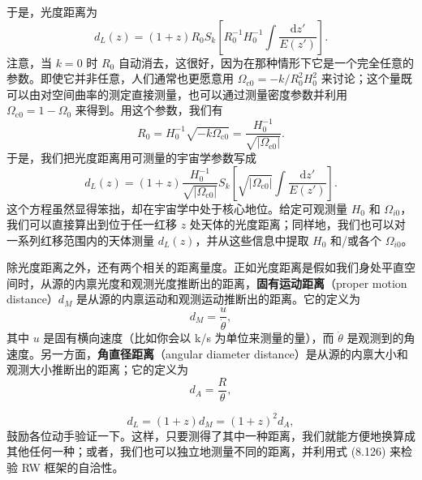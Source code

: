 于是，光度距离为
\begin{equation*}
d_L(z) = (1+z)R_0S_k\left[R_0^{-1}H_0^{-1}\int\frac{\mathrm{d}z'}{E(z')}\right].
\tag{8.121}
\end{equation*}
注意，当 $k=0$ 时 $R_0$ 自动消去，这很好，因为在那种情形下它是一个完全任意的参数。即使它并非任意，人们通常也更愿意用 $\Omega_{\mathrm{c}0}=-k/R_0^{2}H_0^{2}$ 来讨论；这个量既可以由对空间曲率的测定直接测量，也可以通过测量密度参数并利用 $\Omega_{\mathrm{c}0}=1-\Omega_0$ 来得到。用这个参数，我们有
\begin{equation*}
R_0 = H_0^{-1}\sqrt{-k\Omega_{\mathrm{c}0}} = \frac{H_0^{-1}}{\sqrt{|\Omega_{\mathrm{c}0}|}}.
\tag{8.122}
\end{equation*}
于是，我们把光度距离用可测量的宇宙学参数写成
\begin{equation*}
\boxed{\,d_L(z) = (1+z)\frac{H_0^{-1}}{\sqrt{|\Omega_{\mathrm{c}0}|}}S_k\left[\sqrt{|\Omega_{\mathrm{c}0}|}\int\frac{\mathrm{d}z'}{E(z')}\right].\,}
\tag{8.123}
\end{equation*}
这个方程虽然显得笨拙，却在宇宙学中处于核心地位。给定可观测量 $H_0$ 和 $\Omega_{i0}$，我们可以直接算出到位于任一红移 $z$ 处天体的光度距离；同样地，我们也可以对一系列红移范围内的天体测量 $d_L(z)$，并从这些信息中提取 $H_0$ 和/或各个 $\Omega_{i0}$。

除光度距离之外，还有两个相关的距离量度。正如光度距离是假如我们身处平直空间时，从源的内禀光度和观测光度推断出的距离，\textbf{固有运动距离}（proper motion distance）$d_M$ 是从源的内禀运动和观测运动推断出的距离。它的定义为
\begin{equation*}
d_M = \frac{u}{\dot{\theta}},
\tag{8.124}
\end{equation*}
其中 $u$ 是固有横向速度（比如你会以 k/s 为单位来测量的量），而 $\dot{\theta}$ 是观测到的角速度。另一方面，\textbf{角直径距离}（angular diameter distance）是从源的内禀大小和观测大小推断出的距离；它的定义为
\begin{equation*}
d_A = \frac{R}{\theta},
\tag{8.125}
\end{equation*}


\begin{equation*}
d_L = (1+z)d_M = (1+z)^{2}d_A,
\tag{8.126}
\end{equation*}
鼓励各位动手验证一下。这样，只要测得了其中一种距离，我们就能方便地换算成其他任何一种；或者，我们也可以独立地测量不同的距离，并利用式 (8.126) 来检验 RW 框架的自洽性。

